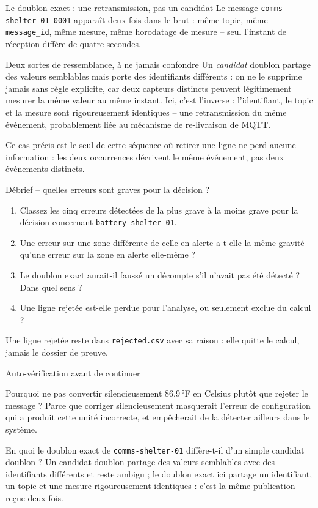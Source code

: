 \documentclass[aspectratio=169]{beamer}
\begin{document}
\begin{frame}{Le doublon exact : une retransmission, pas un candidat}
  \small
  Le message \texttt{comms-shelter-01-0001} apparaît deux fois dans le brut : même topic, même \texttt{message\_id}, même mesure, même horodatage de mesure -- seul l'instant de réception diffère de quatre secondes.
  \begin{alertblock}{Deux sortes de ressemblance, à ne jamais confondre}
    Un \emph{candidat} doublon partage des valeurs semblables mais porte des identifiants différents : on ne le supprime jamais sans règle explicite, car deux capteurs distincts peuvent légitimement mesurer la même valeur au même instant. Ici, c'est l'inverse : l'identifiant, le topic et la mesure sont rigoureusement identiques -- une retransmission du même événement, probablement liée au mécanisme de re-livraison de MQTT.
  \end{alertblock}
  \normalsize Ce cas précis est le seul de cette séquence où retirer une ligne ne perd aucune information : les deux occurrences décrivent le même événement, pas deux événements distincts.
\end{frame}

\begin{frame}{Débrief -- quelles erreurs sont graves pour la décision ?}
  \begin{enumerate}
    \item Classez les cinq erreurs détectées de la plus grave à la moins grave pour la décision concernant \texttt{battery-shelter-01}.
    \item Une erreur sur une zone différente de celle en alerte a-t-elle la même gravité qu'une erreur sur la zone en alerte elle-même ?
    \item Le doublon exact aurait-il faussé un décompte s'il n'avait pas été détecté ? Dans quel sens ?
    \item Une ligne rejetée est-elle perdue pour l'analyse, ou seulement exclue du calcul ?
  \end{enumerate}
  \vfill
  \alert{Une ligne rejetée reste dans \texttt{rejected.csv} avec sa raison : elle quitte le calcul, jamais le dossier de preuve.}
\end{frame}

\begin{frame}{Auto-vérification avant de continuer}
  \small
  \begin{block}{Pourquoi ne pas convertir silencieusement 86,9\,°F en Celsius plutôt que rejeter le message ?}
    Parce que corriger silencieusement masquerait l'erreur de configuration qui a produit cette unité incorrecte, et empêcherait de la détecter ailleurs dans le système.
  \end{block}
  \begin{block}{En quoi le doublon exact de \texttt{comms-shelter-01} diffère-t-il d'un simple candidat doublon ?}
    Un candidat doublon partage des valeurs semblables avec des identifiants différents et reste ambigu ; le doublon exact ici partage un identifiant, un topic et une mesure rigoureusement identiques : c'est la même publication reçue deux fois.
  \end{block}
\end{frame}
\end{document}
